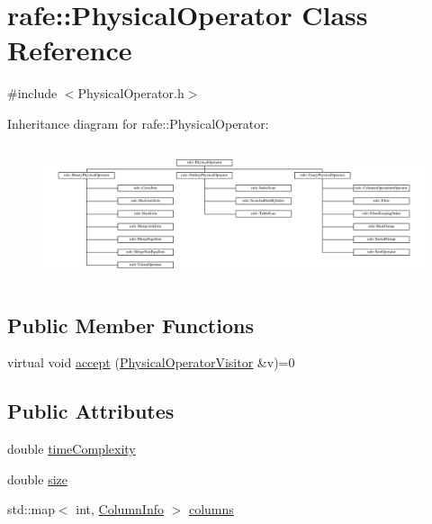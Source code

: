 \hypertarget{classrafe_1_1_physical_operator}{\section{rafe\+:\+:Physical\+Operator Class Reference}
\label{classrafe_1_1_physical_operator}
}


{\ttfamily \#include $<$Physical\+Operator.\+h$>$}

Inheritance diagram for rafe\+:\+:Physical\+Operator\+:\begin{figure}[H]
\begin{center}
\leavevmode
\includegraphics[height=4.000000cm]{classrafe_1_1_physical_operator}
\end{center}
\end{figure}
\subsection*{Public Member Functions}
\begin{DoxyCompactItemize}
\item 
virtual void \hyperlink{classrafe_1_1_physical_operator_a263a89f54604263cea897c5adf8944a3}{accept} (\hyperlink{classrafe_1_1_physical_operator_visitor}{Physical\+Operator\+Visitor} \&v)=0
\end{DoxyCompactItemize}
\subsection*{Public Attributes}
\begin{DoxyCompactItemize}
\item 
double \hyperlink{classrafe_1_1_physical_operator_a7b1bec2ef31be7b9c85ab32f543e23af}{time\+Complexity}
\item 
double \hyperlink{classrafe_1_1_physical_operator_a91df60e6935353504d02b9534a16eb4c}{size}
\item 
std\+::map$<$ int, \hyperlink{classrafe_1_1_column_info}{Column\+Info} $>$ \hyperlink{classrafe_1_1_physical_operator_a4056113435af85657e5b61d397db5165}{columns}
\end{DoxyCompactItemize}



